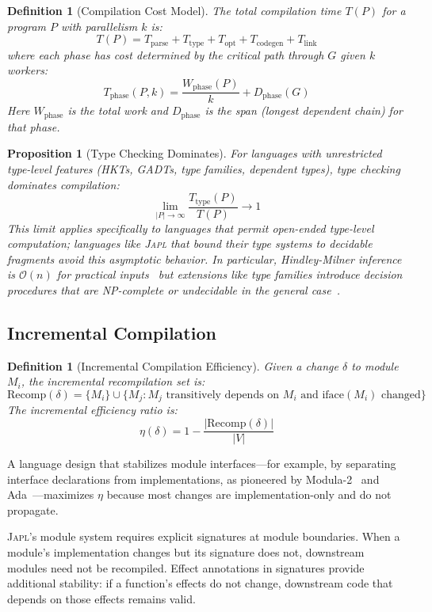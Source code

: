 \documentclass[11pt,twocolumn]{article}
\newtheorem{proposition}[theorem]{Proposition}
\newtheorem{definition}[theorem]{Definition}
\newcommand{\japl}{\textsc{Japl}}
\newcommand{\BigO}{\mathcal{O}}
\begin{document}
\begin{definition}[Compilation Cost Model]
The total compilation time $T(P)$ for a program $P$ with parallelism $k$ is:
\[
T(P) = T_{\text{parse}} + T_{\text{type}} + T_{\text{opt}} + T_{\text{codegen}} + T_{\text{link}}
\]
where each phase has cost determined by the critical path through $G$ given $k$ workers:
\[
T_{\text{phase}}(P, k) = \frac{W_{\text{phase}}(P)}{k} + D_{\text{phase}}(G)
\]
Here $W_{\text{phase}}$ is the total work and $D_{\text{phase}}$ is the span (longest dependent chain) for that phase.
\end{definition}

\begin{proposition}[Type Checking Dominates]
For languages with \emph{unrestricted type-level features} (HKTs, GADTs, type families, dependent types), type checking dominates compilation:
\[
\lim_{|P| \to \infty} \frac{T_{\text{type}}(P)}{T(P)} \to 1
\]
This limit applies specifically to languages that permit open-ended type-level computation; languages like \japl{} that bound their type systems to decidable fragments avoid this asymptotic behavior.
In particular, Hindley-Milner inference is $\BigO(n)$ for practical inputs~\citep{mcadam1998complexity} but extensions like type families introduce decision procedures that are NP-complete or undecidable in the general case~\citep{sulzmann2007type-families}.
\end{proposition}

\subsection{Incremental Compilation}

\begin{definition}[Incremental Compilation Efficiency]
Given a change $\delta$ to module $M_i$, the incremental recompilation set is:
\[
\text{Recomp}(\delta) = \{M_i\} \cup \{M_j : M_j \text{ transitively depends on } M_i \text{ and } \text{iface}(M_i) \text{ changed}\}
\]
The incremental efficiency ratio is:
\[
\eta(\delta) = 1 - \frac{|\text{Recomp}(\delta)|}{|V|}
\]
\end{definition}

A language design that stabilizes module interfaces---for example, by separating interface declarations from implementations, as pioneered by Modula-2~\citep{wirth1982modula2} and Ada~\citep{ichbiah1979ada}---maximizes $\eta$ because most changes are implementation-only and do not propagate.

\japl{}'s module system requires explicit signatures at module boundaries.
When a module's implementation changes but its signature does not, downstream modules need not be recompiled.
Effect annotations in signatures provide additional stability: if a function's effects do not change, downstream code that depends on those effects remains valid.
\end{document}
